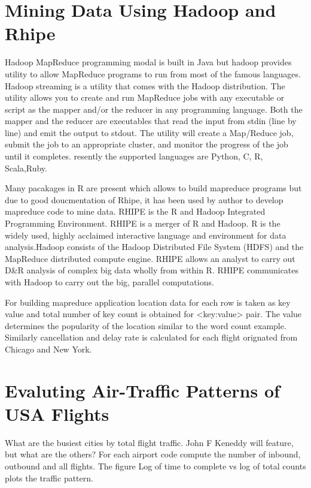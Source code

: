 \section{Mining Data Using Hadoop and Rhipe}

Hadoop MapReduce programming modal is built in Java but hadoop provides utility to allow MapReduce programs to run from most of the famous languages. Hadoop streaming is a utility that comes with the Hadoop distribution. The utility allows you to create and run MapReduce jobs with any executable or script as the mapper and/or the reducer in any programming language. Both the mapper and the reducer are executables that read the input from stdin (line by line) and emit the output to stdout. The utility will create a Map/Reduce job, submit the job to an appropriate cluster, and monitor the progress of the job until it completes. resently the supported languages are Python, C, R, Scala,Ruby.


Many pacakages in R are present which allows to build mapreduce programs but due to good doucmentation of Rhipe, it has been used by author to develop mapreduce code to mine data. RHIPE is the R and Hadoop Integrated Programming Environment. RHIPE is a merger of R and Hadoop. R is the widely used, highly acclaimed interactive language and environment for data analysis.Hadoop consists of the Hadoop Distributed File System (HDFS) and the MapReduce distributed compute engine. RHIPE allows an analyst to carry out D\&R analysis of complex big data wholly from within R. RHIPE communicates with Hadoop to carry out the big, parallel computations. 

For building mapreduce application location data for each row is taken as key value and total number of key count is obtained for  <key:value> pair. The value determines the popularity of the location similar to the word count example. Similarly cancellation and delay rate is calculated for each flight orignated from Chicago and New York.


\section{Evaluting Air-Traffic Patterns of USA Flights}
What are the busiest cities by total flight traffic. John F Keneddy will feature, but what are the others? For each airport code compute the number of inbound, outbound and all flights. The figure Log of time to complete vs log of total counts plots the traffic pattern. 

